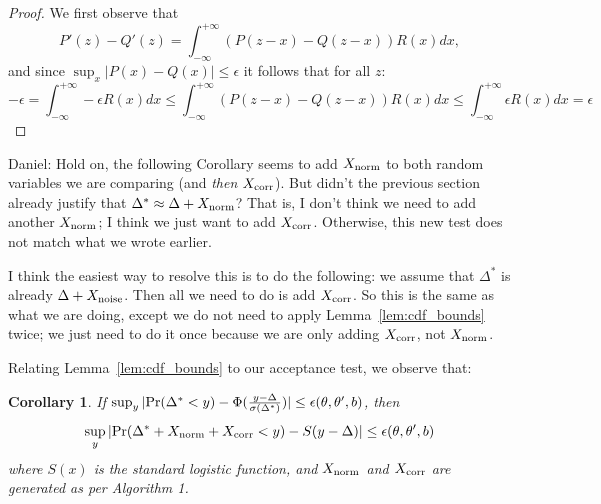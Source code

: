 \documentclass{article}
\newtheorem{corollary}{Corollary}
\begin{document}
\begin{proof}
We first observe that
\begin{equation}\label{eq:pdf_difference}
    P'(z) - Q'(z) = \int_{-\infty}^{+\infty}(P(z-x)-Q(z-x))R(x) dx,
\end{equation}
and since $\sup_x|P(x)-Q(x)|\leq \epsilon$ it follows that for all $z$:
\begin{equation}
-\epsilon = \int_{-\infty}^{+\infty} -\epsilon R(x) dx \leq \int_{-\infty}^{+\infty}(P(z-x)-Q(z-x))R(x) dx \leq \int_{-\infty}^{+\infty}\epsilon R(x) dx = \epsilon
\end{equation}
\end{proof}

{\color{blue} Daniel: Hold on, the following Corollary seems to add $X_{\rm norm}$
to both random variables we are comparing (and \emph{then} $X_{\rm corr}$). But
didn't the previous section already justify that $\Delta^* \approx \Delta +
X_{\rm norm}$? That is, I don't think we need to add another $X_{\rm norm}$; I
think we just want to add $X_{\rm corr}$. Otherwise, this new test does not
match what we wrote earlier.

I think the easiest way to resolve this is to do the following: we assume that
$\Delta^*$ is already $\Delta + X_{\rm noise}$. Then all we need to do is add
$X_{\rm corr}$. So this is the same as what we are doing, except we do not need
to apply Lemma~\ref{lem:cdf_bounds} twice; we just need to do it once because we
are only adding $X_{\rm corr}$, not $X_{\rm norm}$.}

Relating Lemma~\ref{lem:cdf_bounds} to our acceptance test, we observe that:

\begin{corollary}\label{cor:bounds_preserved}
If $\sup_y|{\rm Pr}(\Delta^* < y) - \Phi(\frac{y-\Delta}{\sigma(\Delta^*)})|
\leq \epsilon(\theta,\theta',b)$, then
\begin{equation}
    \sup_y|{\rm Pr}(\Delta^*+X_{\rm norm}+X_{\rm corr} < y) - S(y-\Delta)| \leq \epsilon(\theta,\theta',b)
\end{equation}
where $S(x)$ is the standard logistic function, and $X_{\rm norm}$ and $X_{\rm corr}$ are generated as per Algorithm 1. 
\end{corollary}
\end{document}
